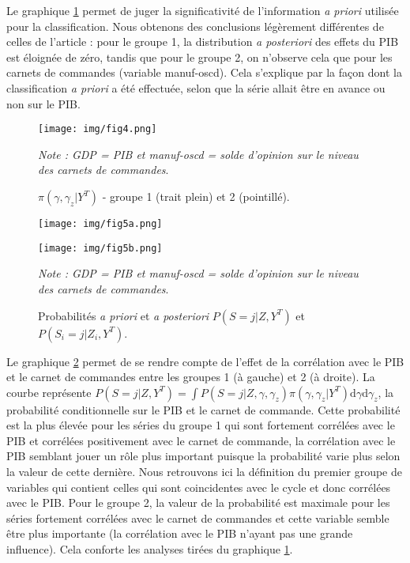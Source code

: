 \documentclass[10pt,french,french]{article}
\begin{document}
Le graphique \ref{pi-gamma} permet de juger la significativité de l'information \emph{a priori} utilisée pour la classification.
Nous obtenons des conclusions légèrement différentes de celles de l'article : pour le groupe 1, la distribution \emph{a posteriori} des effets du PIB est éloignée de zéro, tandis que pour le groupe 2, on n'observe cela que pour les carnets de commandes (variable manuf-oscd).
Cela s'explique par la façon dont la classification \emph{a priori} a été effectuée, selon que la série allait être en avance ou non sur le PIB.

\begin{figure}[htb]
\centering
\texttt{[image: img/fig4.png]}
\caption{$\pi(\gamma,\gamma_z|Y^T)$ - groupe 1 (trait plein) et 2 (pointillé).}
\label{pi-gamma}
\footnotesize
\emph{Note : GDP = PIB et manuf-oscd = solde d'opinion sur le niveau des carnets de commandes}.
\end{figure}

\begin{figure}[htb]
\begin{minipage}{.5\textwidth}
\texttt{[image: img/fig5a.png]}
\end{minipage}
\hfill
\begin{minipage}{.5\textwidth}
\texttt{[image: img/fig5b.png]}
\end{minipage}
\caption{Probabilités \textit{a priori} et \textit{a posteriori} $P(S = j|Z,Y^T)$ et $P(S_i = j|Z_i,Y^T)$.}
\label{graph3d}
\footnotesize
\emph{Note : GDP = PIB et manuf-oscd = solde d'opinion sur le niveau des carnets de commandes}.
\end{figure}

Le graphique \ref{graph3d} permet de se rendre compte de l'effet de la corrélation avec le PIB et le carnet de commandes entre les groupes 1 (à gauche) et 2 (à droite).
La courbe représente \(P(S = j|Z,Y^T) = \int P(S=j|Z,\gamma,\gamma_z)\pi(\gamma,\gamma_z|Y^T)\mathrm{d}\gamma\mathrm{d}\gamma_z\), la probabilité conditionnelle sur le PIB et le carnet de commande.
Cette probabilité est la plus élevée pour les séries du groupe 1 qui sont fortement corrélées avec le PIB et corrélées positivement avec le carnet de commande, la corrélation avec le PIB semblant jouer un rôle plus important puisque la probabilité varie plus selon la valeur de cette dernière.
Nous retrouvons ici la définition du premier groupe de variables qui contient celles qui sont coincidentes avec le cycle et donc corrélées avec le PIB.
Pour le groupe 2, la valeur de la probabilité est maximale pour les séries fortement corrélées avec le carnet de commandes et cette variable semble être plus importante (la corrélation avec le PIB n'ayant pas une grande influence).
Cela conforte les analyses tirées du graphique \ref{pi-gamma}.
\end{document}
